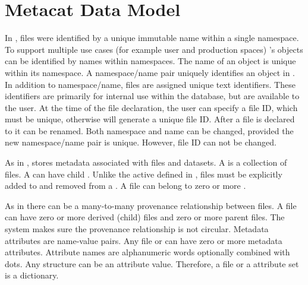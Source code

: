 \documentclass[../main-v1.tex]{subfiles}
\begin{document}
\section{Metacat Data Model }
In , files were identified by a unique immutable name within a single namespace.  To support  multiple use cases (for example user and production spaces) 's objects %
can be identified  by names within namespaces. The name of an object is unique within its namespace. A namespace/name pair uniquely identifies  an object in . In addition to namespace/name, files are assigned unique text identifiers. These identifiers are primarily for internal use within the  database, but are available to the user. At the time of the file declaration, the user can specify a file ID, which must be unique, otherwise  will generate a unique file ID. After a file is declared to  it can be renamed. Both namespace and name can be changed, provided the new namespace/name pair is unique. However, file ID can not be changed. 

As in ,  stores metadata associated with files and datasets. %
A  is a collection of files. A  can have child .  %
Unlike the active  defined   in , files must be explicitly added to and removed from a . 
A file can belong to zero or more . 


As in  there can be a many-to-many provenance relationship between files. A file can have zero or more derived (child) files and zero or more parent files. The system makes sure the provenance relationship is not circular. 
Metadata attributes are name-value pairs. Any file or  can have zero or more metadata attributes. Attribute names are alphanumeric words optionally combined with dots. Any  structure can be an attribute value. Therefore, a file or a  attribute set is a  dictionary. 
\end{document}
